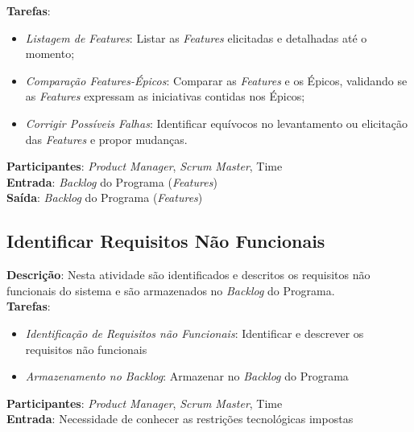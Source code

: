   \textbf{Tarefas}:
  \begin{itemize}
   \item \indent \textit{Listagem de \textit{Features}}: Listar as \textit{Features} elicitadas e detalhadas até o momento;

   \item \indent \textit{Comparação \textit{Features}-Épicos}: Comparar as \textit{Features} e os Épicos, validando se as \textit{Features} expressam as iniciativas contidas nos Épicos;

   \item \indent \textit{Corrigir Possíveis Falhas}: Identificar equívocos no levantamento ou elicitação das \textit{Features} e propor mudanças.
  \end{itemize}

  \textbf{Participantes}: \textit{Product Manager}, \textit{Scrum Master}, Time \\

  \textbf{Entrada}: \textit{Backlog} do Programa (\textit{Features})\\

  \textbf{Saída}:   \textit{Backlog} do Programa (\textit{Features})\\

\subsection{Identificar Requisitos Não Funcionais}
  \textbf{Descrição}: Nesta atividade são identificados e descritos os requisitos não funcionais do sistema e são armazenados no \textit{Backlog} do Programa.  \\

  \textbf{Tarefas}:
  \begin{itemize}
   \item \indent \textit{Identificação de Requisitos não Funcionais}: Identificar e descrever os requisitos não funcionais

   \item \indent \textit{Armazenamento no \textit{Backlog}}: Armazenar no \textit{Backlog} do Programa
  \end{itemize}

  \textbf{Participantes}: \textit{Product Manager}, \textit{Scrum Master}, Time \\

  \textbf{Entrada}:  Necessidade de conhecer as restrições tecnológicas impostas\\

